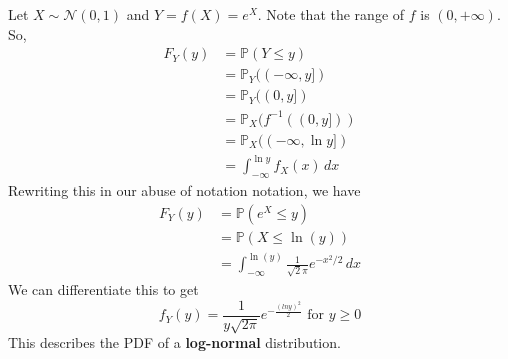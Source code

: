     \begin{example}
      Let $X \sim \mathcal{N}(0, 1)$ and $Y = f(X) = e^X$. Note that the range of $f$ is $(0, +\infty)$. So, 
      \begin{align*}
        F_Y (y) & = \mathbb{P}(Y \leq y) \\
        & = \mathbb{P}_Y ((-\infty, y]) \\
        & = \mathbb{P}_Y ( (0, y]) \\ 
        & = \mathbb{P}_X ( f^{-1} ((0, y]) ) \\
        & = \mathbb{P}_X ( (-\infty, \ln{y}] ) \\
        & = \int_{-\infty}^{\ln{y}} f_X (x)\,dx 
      \end{align*}
      Rewriting this in our abuse of notation notation, we have 
      \begin{align*}
        F_Y (y) & = \mathbb{P}(e^X \leq y) \\
        & = \mathbb{P}(X \leq \ln(y)) \\ 
        & = \int_{-\infty}^{\ln(y)} \frac{1}{\sqrt{2} \pi} e^{-x^2/ 2} \,dx 
      \end{align*}
      We can differentiate this to get 
      \begin{equation}
        f_Y (y) = \frac{1}{y \sqrt{2 \pi}} e^{-\frac{(ln{y})^2}{2}} \text{ for } y \geq 0
      \end{equation}
      This describes the PDF of a \textbf{log-normal} distribution. 
    \end{example}

